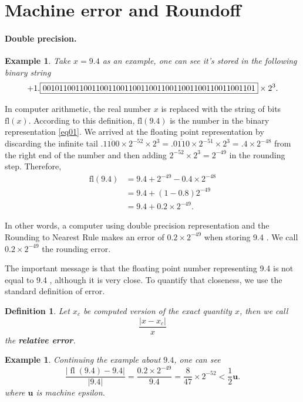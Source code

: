 \documentclass[dvipsnames, 12pt]{article}
\newcommand{\uu}{\mathbf{u}}
\newtheorem{Definition}[Theorem]{Definition}
\newtheorem{Example}[Theorem]{Example}
\begin{document}
\newpage

\section{Machine error and Roundoff}

\paragraph{Double precision.} 

\begin{Example}\label{example01}
    Take $x=9.4$ as an example, one can see it's stored in the following binary string
    \begin{equation}\label{eq01}
    +1.\fbox{$0010110011001100110011001100110011001100110011001101$}\times 2^3 .
    \end{equation}
\end{Example}
In computer arithmetic, the real number $x$ is replaced with the string of bits $\mathrm{fl}(x)$. According to this definition, $\mathrm{fl}(9.4)$ is the number in the binary representation \eqref{eq01}. We arrived at the floating point representation by discarding the infinite tail $. \overline{1100} \times 2^{-52} \times 2^3=. \overline{0110} \times 2^{-51} \times 2^3=.4 \times 2^{-48}$ from the right end of the number and then adding $2^{-52} \times 2^3=2^{-49}$ in the rounding step. Therefore,
$$
\begin{aligned}
\mathrm{fl}(9.4) & =9.4+2^{-49}-0.4 \times 2^{-48} \\
& =9.4+(1-0.8) 2^{-49} \\
& =9.4+0.2 \times 2^{-49} .
\end{aligned}
$$

In other words, a computer using double precision representation and the Rounding to Nearest Rule makes an error of $0.2 \times 2^{-49}$ when storing 9.4 . We call $0.2 \times 2^{-49}$ the rounding error. 

The important message is that the floating point number representing 9.4 is not equal to 9.4 , although it is very close. To quantify that closeness, we use the standard definition of error.

\begin{Definition}
    Let $x_{c}$ be computed version of the exact quantity $x$, then we call
    $$
    \frac{|x-x_{c}|}{x}
    $$
    the \textbf{relative error}.
\end{Definition}


\begin{Example}\label{example02}
    Continuing the example about $9.4$, one can see
    $$
    \frac{|\operatorname{fl}(9.4)-9.4|}{|9.4|}=\frac{0.2\times 2^{-49}}{9.4}=\frac{8}{47}\times 2^{-52}<\frac{1}{2}\mathbf{u}.
    $$
    where $\uu$ is machine epsilon.
\end{Example}
\end{document}
